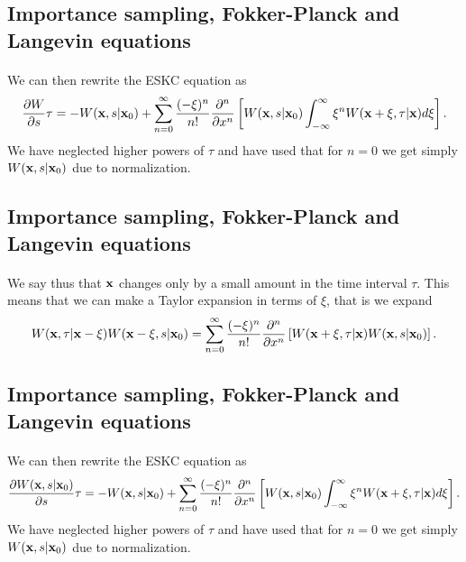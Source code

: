 \documentclass[%
twoside,                 %
final,                   %
10pt]{article}
\begin{document}
{{{{{{%
\subsection{Importance sampling, Fokker-Planck and Langevin equations}

\paragraph{}
We can then rewrite the ESKC equation as 
\[
\frac{\partial W}{\partial s}\tau=-W({\bf x},s|{\bf x}_0)+
\sum_{n=0}^{\infty}\frac{(-\xi)^n}{n!}\frac{\partial^n}{\partial x^n}
\left[W({\bf x},s|{\bf x}_0)\int_{-\infty}^{\infty} \xi^nW({\bf x}+\xi,\tau|{\bf x})d\xi\right].
\]
We have neglected higher powers of $\tau$ and have used that for $n=0$ 
we get simply $W({\bf x},s|{\bf x}_0)$ due to normalization.




\subsection{Importance sampling, Fokker-Planck and Langevin equations}

\paragraph{}
We say thus that ${\bf x}$ changes only by a small amount in the time interval $\tau$. 
This means that we can make a Taylor expansion in terms of $\xi$, that is we
expand
\[
W({\bf x},\tau|{\bf x}-\xi)W({\bf x}-\xi,s|{\bf x}_0) =
\sum_{n=0}^{\infty}\frac{(-\xi)^n}{n!}\frac{\partial^n}{\partial x^n}\left[W({\bf x}+\xi,\tau|{\bf x})W({\bf x},s|{\bf x}_0)
\right].
\]




\subsection{Importance sampling, Fokker-Planck and Langevin equations}

\paragraph{}
We can then rewrite the ESKC equation as 
\[
\frac{\partial W({\bf x},s|{\bf x}_0)}{\partial s}\tau=-W({\bf x},s|{\bf x}_0)+
\sum_{n=0}^{\infty}\frac{(-\xi)^n}{n!}\frac{\partial^n}{\partial x^n}
\left[W({\bf x},s|{\bf x}_0)\int_{-\infty}^{\infty} \xi^nW({\bf x}+\xi,\tau|{\bf x})d\xi\right].
\]
We have neglected higher powers of $\tau$ and have used that for $n=0$ 
we get simply $W({\bf x},s|{\bf x}_0)$ due to normalization.




}}}}}}
\end{document}
